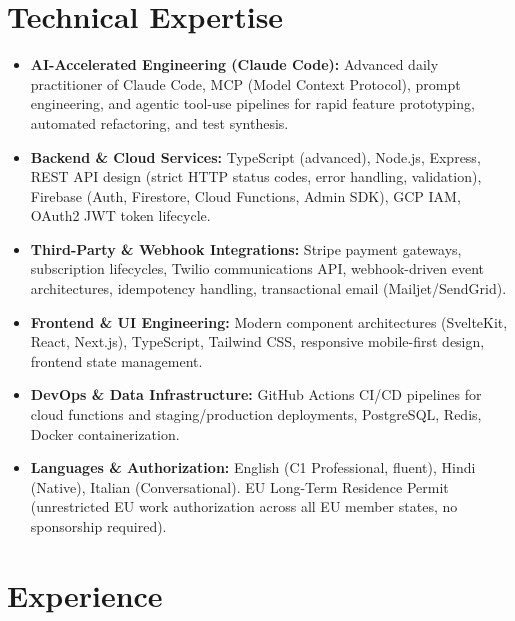 \documentclass[10pt,a4paper]{article}
\begin{document}
\section{Technical Expertise}
\begin{itemize}
  \item \textbf{AI-Accelerated Engineering (Claude Code):} Advanced daily practitioner of Claude Code, MCP (Model Context Protocol), prompt engineering, and agentic tool-use pipelines for rapid feature prototyping, automated refactoring, and test synthesis.
  \item \textbf{Backend \& Cloud Services:} TypeScript (advanced), Node.js, Express, REST API design (strict HTTP status codes, error handling, validation), Firebase (Auth, Firestore, Cloud Functions, Admin SDK), GCP IAM, OAuth2 JWT token lifecycle.
  \item \textbf{Third-Party \& Webhook Integrations:} Stripe payment gateways, subscription lifecycles, Twilio communications API, webhook-driven event architectures, idempotency handling, transactional email (Mailjet/SendGrid).
  \item \textbf{Frontend \& UI Engineering:} Modern component architectures (SvelteKit, React, Next.js), TypeScript, Tailwind CSS, responsive mobile-first design, frontend state management.
  \item \textbf{DevOps \& Data Infrastructure:} GitHub Actions CI/CD pipelines for cloud functions and staging/production deployments, PostgreSQL, Redis, Docker containerization.
  \item \textbf{Languages \& Authorization:} English (C1 Professional, fluent), Hindi (Native), Italian (Conversational). EU Long-Term Residence Permit (unrestricted EU work authorization across all EU member states, no sponsorship required).
\end{itemize}

\section{Experience}
\end{document}
